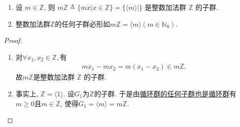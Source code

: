 \documentclass[../../main.tex]{subfiles}%
\begin{document}
\begin{corollary}\label{corollary:抽象代数--定理1.8.1推论}
\begin{enumerate}[(1)]
\item\label{corollary:抽象代数--定理1.8.1推论-1} 设 \( m \in \mathbb{Z} \), 则 \( m\mathbb{Z} \triangleq  \{mx|x \in \mathbb{Z}\}=\{\langle m \rangle\mid \} \) 是整数加法群 \( \mathbb{Z} \) 的子群. 

\item\label{corollary:抽象代数--定理1.8.1推论-2} 整数加法群$\mathbb{Z}$的任何子群必形如$m\mathbb{Z}=\langle m \rangle(m\in \mathbb{N}_0)$.
\end{enumerate}
\end{corollary}
\begin{proof}
\begin{enumerate}[(1)]
\item 对$\forall x_1,x_2\in \mathbb{Z},$有
\begin{align*}
mx_1-mx_2=m(x_1-x_2)\in m\mathbb{Z}.
\end{align*}
故$m\mathbb{Z}$是整数加法群 \( \mathbb{Z} \) 的子群. 

\item 事实上, $\mathbb{Z}=\langle 1\rangle$. 设$G_1$为$\mathbb{Z}$的子群. 于是由\hyperref[theorem:循环群的任何子群也是循环群]{循环群的任何子群也是循环群}有$m\geqslant 0\text{且}m\in \mathbb{Z}$, 使得$G_1=\langle m\rangle=m\mathbb{Z}$.
\end{enumerate}

\end{proof}
\end{document}
